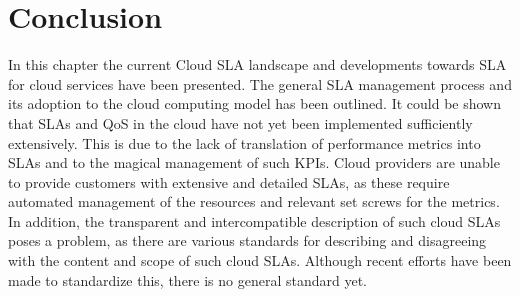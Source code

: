 %
%

 
 
  \section{Conclusion}
In this chapter the current Cloud SLA landscape and developments towards SLA for cloud services have been presented. The general SLA management process and its adoption to the cloud computing model has been outlined. It could be shown that SLAs and QoS in the cloud have not yet been implemented sufficiently extensively. This is due to the lack of translation of performance metrics into SLAs and to the magical management of such KPIs. Cloud providers are unable to provide customers with extensive and detailed SLAs, as these require automated management of the resources and relevant set screws for the metrics. In addition, the transparent and intercompatible description of such cloud SLAs poses a problem, as there are various standards for describing and disagreeing with the content and scope of such cloud SLAs. Although recent efforts have been made to standardize this, there is no general standard yet.

